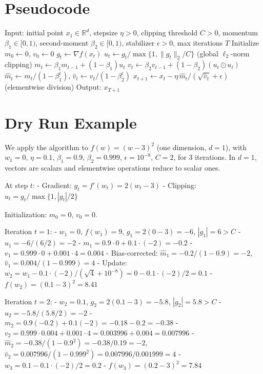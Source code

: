 \documentclass[11pt]{article}
\newcommand{\R}{\mathbb{R}}
\begin{document}
\section*{Pseudocode}
\begin{algorithm}[H]
\caption{Clipped Adam with Momentum}
\begin{algorithmic}[1]
\STATE Input: initial point $x_1\in\R^d$, stepsize $\eta>0$, clipping threshold $C>0$, momentum $\beta_1\in[0,1)$, second-moment $\beta_2\in[0,1)$, stabilizer $\epsilon>0$, max iterations $T$
\STATE Initialize $m_0\leftarrow 0$, $v_0\leftarrow 0$
  \STATE $g_t \leftarrow \nabla f(x_t)$
  \STATE $u_t \leftarrow g_t / \max\{1,\|g_t\|_2/C\}$  \hfill (global $\ell_2$-norm clipping)
  \STATE $m_t \leftarrow \beta_1 m_{t-1} + (1-\beta_1) u_t$
  \STATE $v_t \leftarrow \beta_2 v_{t-1} + (1-\beta_2) (u_t \odot u_t)$
  \STATE $\hat{m}_t \leftarrow m_t/(1-\beta_1^t)$, $\hat{v}_t \leftarrow v_t/(1-\beta_2^t)$
  \STATE $x_{t+1} \leftarrow x_t - \eta \, \hat{m}_t / (\sqrt{\hat{v}_t} + \epsilon)$ \hfill (elementwise division)
\ENDFOR
\STATE Output: $x_{T+1}$
\end{algorithmic}
\end{algorithm}

\section*{Dry Run Example}
We apply the algorithm to $f(w)=(w-3)^2$ (one dimension, $d=1$), with $w_1=0$, $\eta=0.1$, $\beta_1=0.9$, $\beta_2=0.999$, $\epsilon=10^{-8}$, $C=2$, for $3$ iterations. In $d=1$, vectors are scalars and elementwise operations reduce to scalar ones.

At step $t$:
- Gradient: $g_t = f'(w_t) = 2(w_t-3)$
- Clipping: $u_t = g_t/\max\{1,|g_t|/2\}$

Initialization: $m_0=0$, $v_0=0$.

Iteration $t=1$:
- $w_1=0$, $f(w_1)=9$, $g_1=2(0-3)=-6$, $|g_1|=6>C$
- $u_1 = -6 / (6/2) = -2$
- $m_1 = 0.9\cdot 0 + 0.1\cdot(-2) = -0.2$
- $v_1 = 0.999\cdot 0 + 0.001\cdot 4 = 0.004$
- Bias-corrected: $\hat{m}_1 = -0.2/(1-0.9) = -2$, $\hat{v}_1 = 0.004/(1-0.999) = 4$
- Update: $w_2 = w_1 - 0.1\cdot (-2)/(\sqrt{4}+10^{-8}) = 0 - 0.1\cdot (-2)/2 = 0.1$
- $f(w_2) = (0.1-3)^2 = 8.41$

Iteration $t=2$:
- $w_2=0.1$, $g_2=2(0.1-3)=-5.8$, $|g_2|=5.8>C$
- $u_2=-5.8/(5.8/2)=-2$
- $m_2=0.9(-0.2)+0.1(-2)= -0.18-0.2=-0.38$
- $v_2=0.999\cdot 0.004+0.001\cdot 4 = 0.003996+0.004=0.007996$
- $\hat{m}_2 = -0.38/(1-0.9^2) = -0.38/0.19 = -2$, $\hat{v}_2 = 0.007996/(1-0.999^2) = 0.007996/0.001999 = 4$
- $w_3 = 0.1 - 0.1\cdot (-2)/2 = 0.2$
- $f(w_3)=(0.2-3)^2=7.84$
\end{document}
